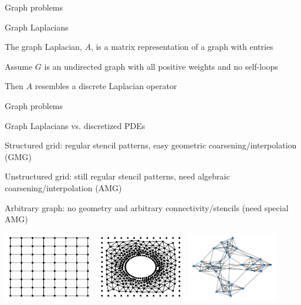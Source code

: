 \documentclass[18pt,xcolor=table]{beamer}
\begin{document}
\begin{frame}{Graph problems}
\begin{block}{Graph Laplacians}
\bit
\item The graph Laplacian, $A$, is a matrix representation of a graph with entries
\item Assume $G$ is an undirected graph with all positive weights and no self-loops
\item Then $A$ resembles a discrete Laplacian operator 
\eit
\end{block}
\end{frame}

\begin{frame}{Graph problems}
\begin{block}{Graph Laplacians vs. discretized PDEs}
\bit
\item Structured grid: regular stencil patterns, easy geometric coarsening/interpolation (GMG)
\item Unstructured grid: still regular stencil patterns, need algebraic coarsening/interpolation (AMG)
\item Arbitrary graph: no geometry and arbitrary connectivity/stencils (need special AMG)
\eit
\end{block}
\begin{center}
\includegraphics[width=0.3\textwidth]{../figures/structuredGrid}
\includegraphics[width=0.3\textwidth]{../figures/unstructuredGrid}
\includegraphics[width=0.3\textwidth]{../figures/graph}
\end{center}
\end{frame}
\end{document}
